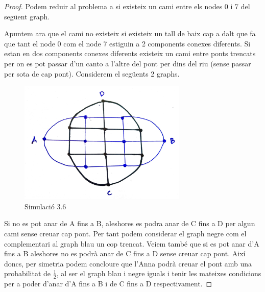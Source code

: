 \documentclass[12pt, a4papre]{article}
\begin{document}
	\begin{proof} Podem reduir al problema a si existeix un cami entre els nodes 0 i 7 del següent graph.
	
\begin{center}
\end{center}

		Apuntem ara que el cami no existeix si existeix un tall de baix cap a dalt que fa que tant el node 0 com el node 7 estiguin a 2 components conexes diferents. Si estan en dos components conexes diferents existeix un cami entre ponts trencats per on es pot passar d'un canto a l'altre del pont per dins del riu (sense passar per sota de cap pont). Considerem el següents 2 graphs.
		
		\begin{figure}[H]
		        \begin{center}
		        \includegraphics[width=80mm]{graph2}
		        \caption{Simulació 3.6}
		        \end{center}
		    \end{figure}
		\graphicspath{ {./Images/} }
		
		Si no es pot anar de A fins a B, aleshores es podra anar de C fins a D per algun cami sense creuar cap pont. Per tant podem considerar el graph negre com el complementari al graph blau un cop trencat. Veiem també que si es pot anar d'A fins a B aleshores no es podrà anar de C fins a D sense creuar cap pont. Així doncs, per simetria podem concloure que l'Anna podrà creuar el pont amb una probabilitat de $\frac{1}{2}$, al ser el graph blau i negre iguals i tenir les mateixes condicions per a poder d'anar d'A fins a B i de C fins a D respectivament.
		
	\end{proof}
	
	

	
	
\end{document}
